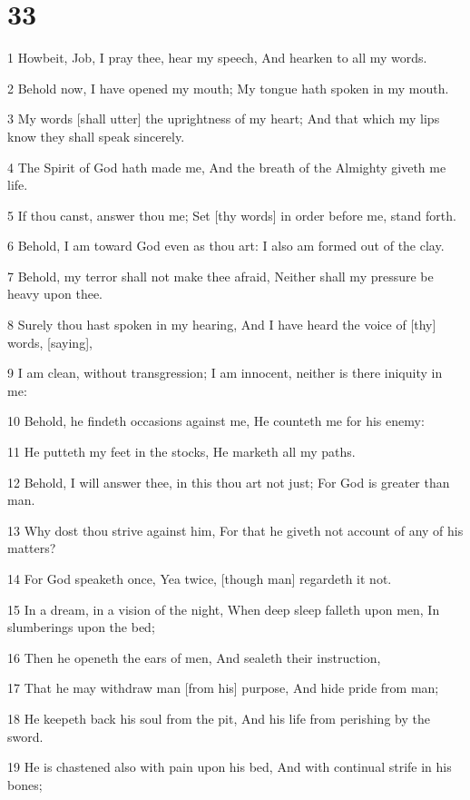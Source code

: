 \chapter{33}

\par 1 Howbeit, Job, I pray thee, hear my speech, And hearken to all my words.
\par 2 Behold now, I have opened my mouth; My tongue hath spoken in my mouth.
\par 3 My words [shall utter] the uprightness of my heart; And that which my lips know they shall speak sincerely.
\par 4 The Spirit of God hath made me, And the breath of the Almighty giveth me life.
\par 5 If thou canst, answer thou me; Set [thy words] in order before me, stand forth.
\par 6 Behold, I am toward God even as thou art: I also am formed out of the clay.
\par 7 Behold, my terror shall not make thee afraid, Neither shall my pressure be heavy upon thee.
\par 8 Surely thou hast spoken in my hearing, And I have heard the voice of [thy] words, [saying],
\par 9 I am clean, without transgression; I am innocent, neither is there iniquity in me:
\par 10 Behold, he findeth occasions against me, He counteth me for his enemy:
\par 11 He putteth my feet in the stocks, He marketh all my paths.
\par 12 Behold, I will answer thee, in this thou art not just; For God is greater than man.
\par 13 Why dost thou strive against him, For that he giveth not account of any of his matters?
\par 14 For God speaketh once, Yea twice, [though man] regardeth it not.
\par 15 In a dream, in a vision of the night, When deep sleep falleth upon men, In slumberings upon the bed;
\par 16 Then he openeth the ears of men, And sealeth their instruction,
\par 17 That he may withdraw man [from his] purpose, And hide pride from man;
\par 18 He keepeth back his soul from the pit, And his life from perishing by the sword.
\par 19 He is chastened also with pain upon his bed, And with continual strife in his bones;
